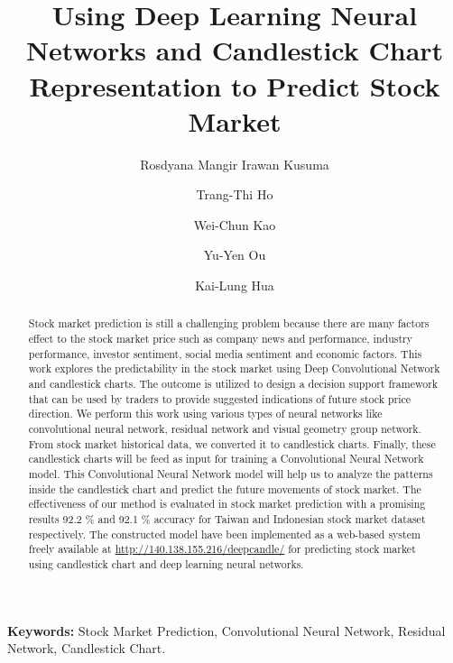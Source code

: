 \documentclass[12pt]{article}
\begin{document}
\title{Using Deep Learning Neural Networks and Candlestick Chart Representation to Predict Stock Market}



\author[1]{Rosdyana Mangir Irawan Kusuma}
\author[2]{Trang-Thi Ho}
\author[3]{Wei-Chun Kao}
\author[1]{Yu-Yen Ou}
\author[2]{Kai-Lung Hua}
\renewcommand\Authands{ and }

\maketitle

\thispagestyle{empty}

\begin{abstract}Stock market prediction is still a challenging problem because there are many factors effect to the stock market price such as company news and performance, industry performance, investor sentiment, social media sentiment and economic factors. This work explores the predictability in the stock market using Deep Convolutional Network and candlestick charts. The outcome is utilized to design a decision support framework that can be used by traders to provide suggested indications of future stock price direction. We perform this work using various types of neural networks like convolutional neural network, residual network and visual geometry group network. From stock market historical data, we converted it to candlestick charts. Finally, these candlestick charts will be feed as input for training a Convolutional Neural Network model. This Convolutional Neural Network model will help us to analyze the patterns inside the candlestick chart and predict the future movements of stock market. The effectiveness of our method is evaluated in stock market prediction with a promising results 92.2 \% and 92.1 \% accuracy for Taiwan and Indonesian stock market dataset respectively. The constructed model have been implemented as a web-based system freely available at \url{http://140.138.155.216/deepcandle/} for predicting stock market using candlestick chart and deep learning neural networks.
\end{abstract}

{\bf Keywords:} Stock Market Prediction, Convolutional Neural Network, Residual Network, Candlestick
Chart.
\end{document}
